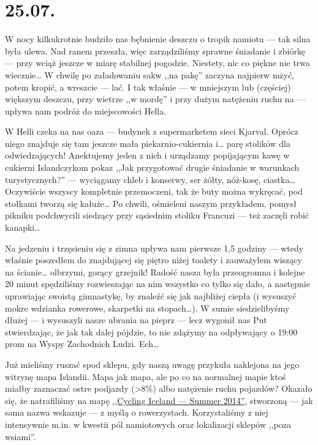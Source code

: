 \chapter*{25.07.}

W nocy kilkukrotnie budziło nas bębnienie deszczu o tropik namiotu --- tak silna była ulewa. Nad ranem przeszła, więc zarządziliśmy sprawne śniadanie i zbiórkę --- przy wciąż jeszcze w miarę stabilnej pogodzie. Niestety, nic co piękne nie trwa wiecznie… W chwilę po załadowaniu sakw ,,na pakę'' zaczyna najpierw mżyć, potem kropić, a wreszcie --- lać. I tak właśnie --- w mniejszym lub (częściej) większym deszczu, przy wietrze ,,w mordę'' i przy dużym natężeniu ruchu na  --- upływa nam podróż do miejscowości Hella.

W Helli czeka na nas oaza --- budynek z supermarketem sieci Kjarval. Oprócz niego znajduje się tam jeszcze mała piekarnio-cukiernia i… parę stolików dla odwiedzających! Anektujemy jeden z nich i urządzamy popijającym kawę w cukierni Islandczykom pokaz ,,Jak przygotować drugie śniadanie w warunkach turystycznych?'' --- wyciągamy chleb i konserwy, ser żółty, nóż-kosę, ciastka… Oczywiście wszyscy kompletnie przemoczeni, tak że buty można wykręcać, pod stołkami tworzą się kałuże… Po chwili, ośmieleni naszym przykładem, pomysł pikniku podchwycili siedzący przy sąsiednim stoliku Francuzi --- też zaczęli robić kanapki…

Na jedzeniu i trzęsieniu się z zimna upływa nam pierwsze 1,5 godziny --- wtedy właśnie poszedłem do znajdującej się piętro niżej toalety i zauważyłem wiszący na ścianie… olbrzymi, gorący grzejnik! Radość nasza była przeogromna i kolejne 20 minut spędziliśmy rozwieszając na nim wszystko co tylko się dało, a następnie uprawiając swoistą gimnastykę, by znaleźć się jak najbliżej ciepła (i wysuszyć mokre wdzianka rowerowe, skarpetki na stopach…). W sumie siedzielibyśmy dłużej --- i wysuszyli nasze ubrania na pieprz --- lecz wygonił nas Put stwierdzając, że jak tak dalej pójdzie, to nie zdążymy na odpływający o 19:00 prom na Wyspy Zachodnich Ludzi. Ech…


Już mieliśmy ruszać spod sklepu, gdy naszą uwagę przykuła naklejona na jego witrynę mapa Islandii. Mapa jak mapa, ale po co na normalnej mapie ktoś miałby zaznaczać ostre podjazdy (>8\%) albo natężenie ruchu pojazdów? Okazało się, że natrafiliśmy na mapę \href{http://www.vegagerdin.is/media/upplysingar-og-utgafa/Cycling-map.pdf}{,,Cycling Iceland --- Summer 2014''}, stworzoną --- jak sama nazwa wskazuje --- z myślą o rowerzystach. Korzystaliśmy z niej intensywnie m.in. w kwestii pól namiotowych oraz lokalizacji sklepów ,,poza wsiami''.

